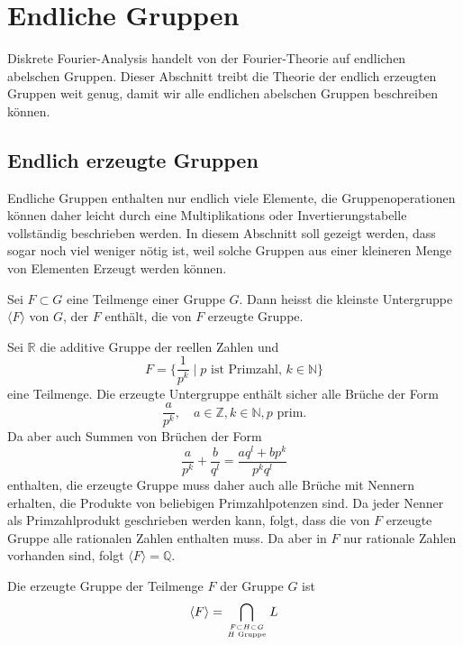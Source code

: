 %
%
%
\section{Endliche Gruppen
\label{buch:diskret:section:endlich}}
Diskrete Fourier-Analysis handelt von der Fourier-Theorie auf
endlichen abelschen Gruppen.
Dieser Abschnitt treibt die Theorie der endlich erzeugten Gruppen
weit genug, damit wir alle endlichen abelschen Gruppen beschreiben
können.

%
%
\subsection{Endlich erzeugte Gruppen
\label{buch:diskret:endlich:subsetion:endlicherzeugt}}
Endliche Gruppen enthalten nur endlich viele Elemente, die Gruppenoperationen
können daher leicht durch eine Multiplikations oder Invertierungstabelle
vollständig beschrieben werden.
In diesem Abschnitt soll gezeigt werden, dass sogar noch viel weniger
nötig ist, weil solche Gruppen aus einer kleineren Menge von Elementen
Erzeugt werden können.

\begin{definition}
Sei $F\subset G$ eine Teilmenge einer Gruppe $G$.
Dann heisst die kleinste Untergruppe $\langle F\rangle$ von $G$,
der $F$ enthält, die von $F$ erzeugte Gruppe.
\end{definition}

\begin{beispiel}
Sei $\mathbb{R}$ die additive Gruppe der reellen Zahlen und
\[
F
=
\biggl\{\frac{1}{p^k}
\;
\bigg|
\;
\text{$p$ ist Primzahl, $k\in\mathbb{N}$}\biggr\}
\]
eine Teilmenge.
Die erzeugte Untergruppe enthält sicher alle Brüche der Form
\[
\frac{a}{p^k},\quad a\in\mathbb{Z},k\in\mathbb{N},\text{$p$ prim}.
\]
Da aber auch Summen von Brüchen der Form
\[
\frac{a}{p^k} + \frac{b}{q^l}
=
\frac{aq^l+bp^k}{p^kq^l}
\]
enthalten, die erzeugte Gruppe muss daher auch alle Brüche mit
Nennern erhalten, die Produkte von beliebigen Primzahlpotenzen sind.
Da jeder Nenner als Primzahlprodukt geschrieben werden kann, folgt,
dass die von $F$ erzeugte Gruppe alle rationalen Zahlen enthalten
muss.
Da aber in $F$ nur rationale Zahlen vorhanden sind, folgt
$\langle F\rangle = \mathbb{Q}$.
\end{beispiel}

\begin{satz}
Die erzeugte Gruppe der Teilmenge $F$ der Gruppe $G$ ist
\[
\langle F\rangle
=
\bigcap_{F\subset H\subset G \atop\text{$H$ Gruppe}} L
\]
\end{satz}

